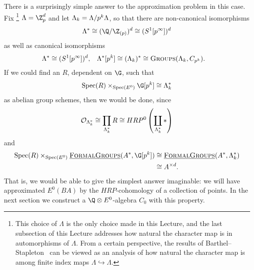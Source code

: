 There is a surprisingly simple answer to the approximation problem in this case.
Fix%
\footnote{%
    This choice of \(\Lambda\) is the only choice made in this Lecture, and the last subsection of this Lecture addresses how natural the character map is in automorphisms of \(\Lambda\).
    From a certain perspective, the results of Barthel--Stapleton~\cite{BarthelStapleton} can be viewed as an analysis of how natural the character map is among finite index maps \(\Lambda \hookrightarrow \Lambda\).
}
\(\Lambda = \Z_{p}^{d}\) and let \(\Lambda_k = \Lambda/p^k\Lambda\), so that there are non-canonical isomorphisms
\[
\Lambda^* \cong (\Q/\Z_{(p)})^d \cong (S^1[p^{\infty}])^d
\] 
as well as canonical isomorphisms
\begin{align*}
\Lambda^* & \cong (S^1[p^{\infty}])^d, &
\Lambda^*[p^k] & \cong (\Lambda_{k})^* \cong \normalfont\textsc{Groups}(\Lambda_k, C_{p^k}).
\end{align*}
If we could find an \(R\), dependent on \(\G\), such that
\[
\Spec(R) \times_{\Spec(E^0)} \G[p^k] \cong \Lk^*
\]
as abelian group schemes, then we would be done, since
\[
\mathcal{O}_{\Lambda_k^*} \cong \prod_{\Lambda_k^*} R \cong HRP^0\left(\coprod_{\Lambda_k^*} \ast\right)
\]
and
\begin{align*}
\Spec(R) \times_{\Spec(E^0)} \InternalHom{FormalGroups}(A^*, \G[p^k]) & \cong \InternalHom{FormalGroups}(A^*, \Lambda_{k}^*) \\
& \cong A^{\times d}.
\end{align*}
That is, we would be able to give the simplest answer imaginable: we will have approximated \(E^0(BA)\) by the \(HRP\)-cohomology of a collection of points.
In the next section we construct a \(\Q \otimes E^0\)-algebra \(C_0\) with this property.




